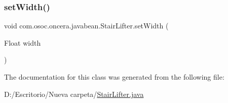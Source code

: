 \mbox{\label{classcom_1_1osoc_1_1oncera_1_1javabean_1_1_stair_lifter_a0efd25873a516fee0af456a712684125}} 
\subsubsection{\texorpdfstring{setWidth()}{setWidth()}}
{\footnotesize\ttfamily void com.\+osoc.\+oncera.\+javabean.\+Stair\+Lifter.\+set\+Width (\begin{DoxyParamCaption}\item[{Float}]{width }\end{DoxyParamCaption})}



The documentation for this class was generated from the following file\+:\begin{DoxyCompactItemize}
\item 
D\+:/\+Escritorio/\+Nueva carpeta/\mbox{\hyperlink{_stair_lifter_8java}{Stair\+Lifter.\+java}}\end{DoxyCompactItemize}
